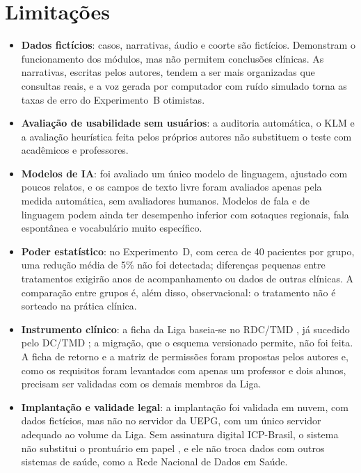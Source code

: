 \section{Limitações}
\label{sec:limitacoes}

\begin{itemize}
	\item \textbf{Dados fictícios}: casos, narrativas, áudio e coorte são fictícios. Demonstram o funcionamento dos módulos, mas não permitem conclusões clínicas. As narrativas, escritas pelos autores, tendem a ser mais organizadas que consultas reais, e a voz gerada por computador com ruído simulado torna as taxas de erro do Experimento~B otimistas.
	\item \textbf{Avaliação de usabilidade sem usuários}: a auditoria automática, o KLM e a avaliação heurística feita pelos próprios autores não substituem o teste com acadêmicos e professores.
	\item \textbf{Modelos de IA}: foi avaliado um único modelo de linguagem, ajustado com poucos relatos, e os campos de texto livre foram avaliados apenas pela medida automática, sem avaliadores humanos. Modelos de fala e de linguagem podem ainda ter desempenho inferior com sotaques regionais, fala espontânea e vocabulário muito específico.
	\item \textbf{Poder estatístico}: no Experimento~D, com cerca de 40 pacientes por grupo, uma redução média de 5\% não foi detectada; diferenças pequenas entre tratamentos exigirão anos de acompanhamento ou dados de outras clínicas. A comparação entre grupos é, além disso, observacional: o tratamento não é sorteado na prática clínica.
	\item \textbf{Instrumento clínico}: a ficha da Liga baseia-se no RDC/TMD \cite{dworkin1992}, já sucedido pelo DC/TMD \cite{schiffman2014}; a migração, que o esquema versionado permite, não foi feita. A ficha de retorno e a matriz de permissões foram propostas pelos autores e, como os requisitos foram levantados com apenas um professor e dois alunos, precisam ser validadas com os demais membros da Liga.
	\item \textbf{Implantação e validade legal}: a implantação foi validada em nuvem, com dados fictícios, mas não no servidor da UEPG, com um único servidor adequado ao volume da Liga. Sem assinatura digital ICP-Brasil, o sistema não substitui o prontuário em papel \cite{lei13787,cfo91-2009}, e ele não troca dados com outros sistemas de saúde, como a Rede Nacional de Dados em Saúde.
\end{itemize}

